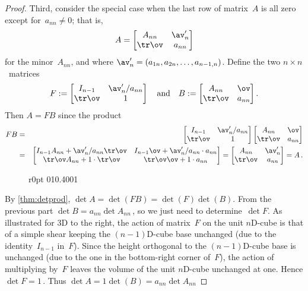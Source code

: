 \begin{proof}
\begin{comment}
The above glosses over details for when \(a_{nn}<0\).
\end{comment}

Third, consider the special case when the last row of matrix~\(A\) is all zero except for~\(a_{nn}\neq0\); that is, 
\begin{equation*}
A=\begin{bmatrix} A_{nn}&\av_n'\\\tr\ov&a_{nn} \end{bmatrix}
\end{equation*}
for the minor~\(A_{nn}\), and where \(\av'_n=(a_{1n},a_{2n},\ldots,a_{n-1,n})\).
Define the two \(n\times n\)~matrices
\begin{equation*}
F:=\begin{bmatrix} I_{n-1}&\av'_n/a_{nn}\\\tr\ov& 1 \end{bmatrix}
\quad\text{and}\quad
B:=\begin{bmatrix} A_{nn}&\ov\\\tr\ov&a_{nn} \end{bmatrix}.
\end{equation*}
Then \(A=FB\) since the product
\begin{eqnarray*}
FB&=&\begin{bmatrix} I_{n-1}&\av'_n/a_{nn}\\\tr\ov& 1 \end{bmatrix}
\begin{bmatrix} A_{nn}&\ov\\\tr\ov&a_{nn} \end{bmatrix}
\\&=&\begin{bmatrix} I_{n-1}A_{nn}+\av'_n/a_{nn}\tr\ov &
I_{n-1}\ov+\av'_n/a_{nn}\cdot a_{nn}\\
\tr\ov A_{nn}+1\cdot\tr\ov &
\tr\ov\ov+1\cdot a_{nn}  \end{bmatrix}
=\begin{bmatrix} A_{nn} &
\av'_n\\
\tr\ov  &
a_{nn}  \end{bmatrix} =A\,.
\end{eqnarray*}

\begin{wrapfigure}r{0pt}
\def\unithouseviews{30}01{0.4}001
\end{wrapfigure}
By \cref{thm:detprod}, \(\det A=\det(FB)=\det(F)\det(B)\).
From the previous part \(\det B=a_{nn}\det A_{nn}\)\,, so we just need to determine~\(\det F\).
As illustrated for 3D to the right, the action of matrix~\(F\) on the unit \(n\)D-cube is that of a simple shear keeping the \((n-1)\)D-cube base unchanged (due to the identity~\(I_{n-1}\) in~\(F\)).
Since the height orthogonal to the \((n-1)\)D-cube base is unchanged (due to the one in the bottom-right corner of~\(F\)), the action of multiplying by~\(F\) leaves the volume of the unit \(n\)D-cube unchanged at one.
Hence \(\det F=1\)\,.
Thus \(\det A=1\det(B)=a_{nn}\det A_{nn}\) 


\end{proof}
